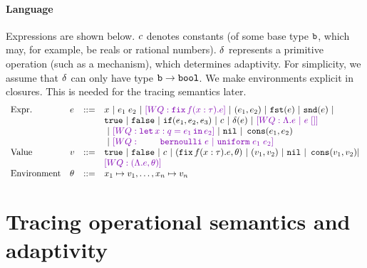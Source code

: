 \documentclass[a4paper,11pt]{article}
\newcommand{\wq}[1]{\textcolor[rgb]{.50,0.0,0.7}{[WQ: #1]}}
\theoremstyle{definition}
\begin{document}
\paragraph{Language}
Expressions are shown below. $c$ denotes constants (of some base
type $\mathtt{b}$, which may, for example, be reals or rational
numbers). $\delta$ represents a primitive operation (such as a
mechanism), which determines adaptivity. For simplicity, we assume
that $\delta$ can only have type $\mathtt{b} \to \mathtt{bool}$. We make
environments explicit in closures. This is needed for the tracing
semantics later.
\[\begin{array}{llll}
\mbox{Expr.} & \expr & ::= & x ~|~ \expr_1 \eapp \expr_2 ~|~ \wq{\efix f(x:\tau).\expr}
 ~|~ (\expr_1, \expr_2) ~|~ \eprojl(\expr) ~|~ \eprojr(\expr) ~| \\
%
& & & \etrue ~|~ \efalse ~|~ \eif(\expr_1, \expr_2, \expr_3) ~|~
\econst ~|~ \eop(\expr)  ~|~ \wq {\eilam \expr ~|~ \expr \eapp [] } \\
& & & ~|~ \wq {\elet  x:q = \expr_1 \ein \expr_2 } ~|~ \enil ~|~  \econs (
      \expr_1, \expr_2) \\
& & & ~|~ \wq{ ~~~~~~~
 \bernoulli \eapp \expr ~|~ \uniform \eapp \expr_1 \eapp
      \expr_2 } \\
%
\mbox{Value} & \valr & ::= & \etrue ~|~ \efalse ~|~ \econst ~|~
(\efix f(x:\tau).\expr, \env) ~|~ (\valr_1, \valr_2) 
    ~|~ \enil ~|~ \econs (\valr_1, \valr_2) | \\
& & & \wq {(\eilam \expr , \env) } \\ 
%
\mbox{Environment} & \env & ::= & x_1 \mapsto \valr_1, \ldots, x_n \mapsto \valr_n
\end{array}\]





\section{Tracing operational semantics and adaptivity}
\end{document}
